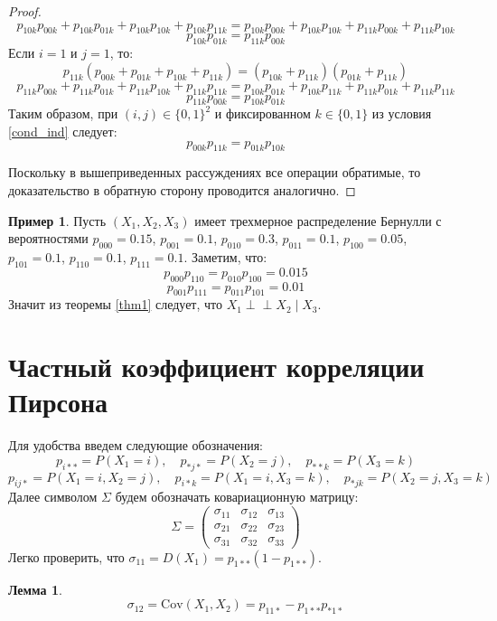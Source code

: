 \documentclass{article}
\theoremstyle{definition}
\newtheorem{example}{Пример}[section]
\newtheorem{lemma}{Лемма}[section]
\def\ci{\perp\!\!\!\perp}
\begin{document}
\begin{proof}
$$    $$
    $$
        p_{10k} p_{00k} + p_{10k} p_{01k} + p_{10k} p_{10k} + p_{10k} p_{11k} = p_{10k}p_{00k} + p_{10k}p_{10k} + p_{11k}p_{00k} + p_{11k}p_{10k}
    $$
    $$
        p_{10k} p_{01k} = p_{11k}p_{00k}
    $$
    Если $i=1$ и $j=1$, то:
    $$
        p_{11k} (p_{00k} + p_{01k} + p_{10k} + p_{11k}) = (p_{10k} + p_{11k}) (p_{01k} + p_{11k})
    $$
    $$
        p_{11k} p_{00k} + p_{11k} p_{01k} + p_{11k} p_{10k} + p_{11k} p_{11k} = p_{10k} p_{01k} + p_{10k}p_{11k} + p_{11k}p_{01k} +
        p_{11k} p_{11k}
    $$
    $$
        p_{11k} p_{00k} = p_{10k} p_{01k}
    $$
    Таким образом, при $(i,j)\in \{0,1\}^2$ и фиксированном $k\in \{0,1\}$ из условия \ref{cond_ind} следует:
    $$p_{00k}p_{11k}=p_{01k}p_{10k}$$

    Поскольку в вышеприведенных рассуждениях все операции обратимые, то доказательство в обратную сторону проводится аналогично.
\end{proof}

\begin{example}
    Пусть $(X_1,X_2,X_3)$ имеет трехмерное распределение Бернулли с вероятностями
    $p_{000}=0.15$, $p_{001}=0.1$, $p_{010}=0.3$, $p_{011}=0.1$, $p_{100}=0.05$, $p_{101}=0.1$,
    $p_{110}=0.1$, $p_{111}=0.1$.
    Заметим, что:
    $$p_{000}p_{110}=p_{010}p_{100}=0.015$$ $$p_{001}p_{111}=p_{011}p_{101}=0.01$$
    Значит из теоремы \ref{thm1} следует, что $X_1 \ci X_2 \mid X_3$.
\end{example}

\section{Частный коэффициент корреляции Пирсона}
Для удобства введем следующие обозначения: $$p_{i**}=P(X_1=i), \quad p_{*j*}=P(X_2=j), \quad p_{**k}=P(X_3=k)$$
$$p_{ij*}=P(X_1=i, X_2=j), \quad p_{i*k}=P(X_1=i, X_3=k), \quad p_{*jk}=P(X_2=j, X_3=k)$$
Далее символом $\Sigma$ будем обозначать ковариационную матрицу:
$$\Sigma =
    \begin{pmatrix}
        \sigma_{11} & \sigma_{12} & \sigma_{13} \\
        \sigma_{21} & \sigma_{22} & \sigma_{23} \\
        \sigma_{31} & \sigma_{32} & \sigma_{33}
    \end{pmatrix}
$$
Легко проверить, что $\sigma_{11}=D(X_1) = p_{1**}(1-p_{1**})$.

\begin{lemma}
    $$\sigma_{12}=\text{Cov}(X_1,X_2)=p_{11*}-p_{1**}p_{*1*}$$
\end{lemma}
\end{document}

